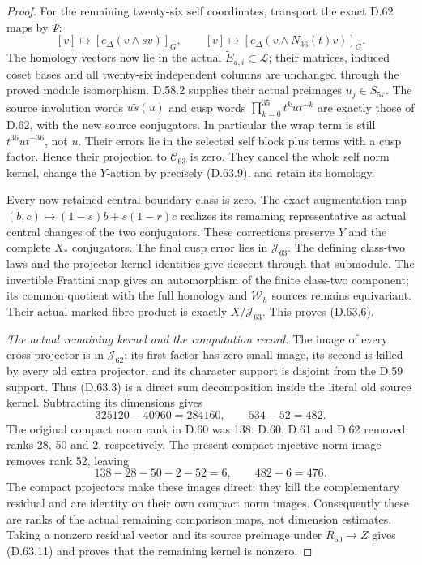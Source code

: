 \begin{proof}
For the remaining twenty-six self coordinates,
transport the exact D.62 maps by \(\Psi\):
\[
 [v]\longmapsto[e_\Delta(v\wedge sv)]_G,
 \qquad
 [v]\longmapsto[e_\Delta(v\wedge N_{36}(t)v)]_G.
 \tag{D.63.25}
\]
The homology vectors now lie in the actual
\(\widetilde E_{a,i}\subset\mathcal L\); their
matrices, induced coset bases and all twenty-six
independent columns are unchanged through the
proved module isomorphism. D.58.2 supplies their
actual preimages \(u_j\in S_{57}\).
The source involution words
\(u\widetilde s(u)\) and cusp words
\(\prod_{k=0}^{35}t^kut^{-k}\) are exactly those
of D.62, with the new source conjugators.
In particular the wrap term is still
\(t^{36}ut^{-36}\), not \(u\).
Their errors lie in the selected self block plus
terms with a cusp factor. Hence their projection
to \(\mathcal C_{63}\) is zero. They cancel the
whole self norm kernel, change the \(Y\)-action
by precisely (D.63.9), and retain its homology.

Every now retained central boundary class is zero.
The exact augmentation map
\((b,c)\mapsto(1-s)b+s(1-r)c\) realizes its remaining
representative as actual central changes of the
two conjugators. These corrections preserve \(Y\)
and the complete \(X_*\) conjugators. The final
cusp error lies in \(\mathcal J_{63}\).
The defining class-two laws and the projector
kernel identities give descent through that
submodule. The invertible Frattini map gives an
automorphism of the finite class-two component;
its common quotient with the full homology and
\(\mathcal W_h\) sources remains equivariant.
Their actual marked fibre product is exactly
\(X/\mathcal J_{63}\). This proves (D.63.6).

\emph{The actual remaining kernel and the computation record.}
The image of every cross projector is in
\(\mathcal J_{62}\): its first factor has zero
small image, its second is killed by every old
extra projector, and its character support is
disjoint from the D.59 support. Thus (D.63.3)
is a direct sum decomposition inside the literal
old source kernel. Subtracting its dimensions
gives
\[
            325120-40960=284160,\qquad
                         534-52=482.
 \tag{D.63.26}
\]
The original compact norm rank in D.60 was 138.
D.60, D.61 and D.62 removed ranks 28, 50 and 2,
respectively. The present compact-injective norm
image removes rank 52, leaving
\[
                138-28-50-2-52=6,
                   \qquad 482-6=476.
 \tag{D.63.27}
\]
The compact projectors make these images direct:
they kill the complementary residual and are
identity on their own compact norm images.
Consequently these are ranks of the actual
remaining comparison maps, not dimension estimates.
Taking a nonzero residual vector and its source
preimage under \(R_{50}\to Z\) gives (D.63.11)
and proves that the remaining kernel is nonzero.


\end{proof}
